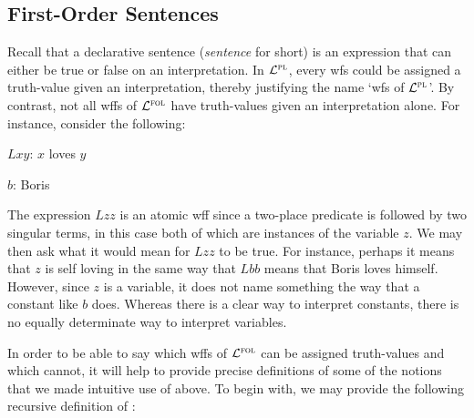 \subsection{First-Order Sentences}

Recall that a declarative sentence (\textit{sentence} for short) is an expression that can either be true or false on an interpretation.
In $\mathcal{L}^{\textsc{pl}}$, every wfs could be assigned a truth-value given an interpretation, thereby justifying the name `wfs of $\mathcal{L}^{\textsc{pl}}$'.
By contrast, not all wffs of $\mathcal{L}^{\textsc{fol}}$ have truth-values given an interpretation alone.
For instance, consider the following:

\begin{ekey}[leftmargin=.6in]
  \item[$Lxy$:] $x$ loves $y$
  \item[$b$:] Boris
\end{ekey}

The expression $Lzz$ is an atomic wff since a two-place predicate is followed by two singular terms, in this case both of which are instances of the variable $z$.
We may then ask what it would mean for $Lzz$ to be true. 
For instance, perhaps it means that $z$ is self loving in the same way that $Lbb$ means that Boris loves himself.
However, since $z$ is a variable, it does not name something the way that a constant like $b$ does.
Whereas there is a clear way to interpret constants, there is no equally determinate way to interpret variables.

In order to be able to say which wffs of $\mathcal{L}^{\textsc{fol}}$ can be assigned truth-values and which cannot, it will help to provide precise definitions of some of the notions that we made intuitive use of above.
To begin with, we may provide the following recursive definition of :

